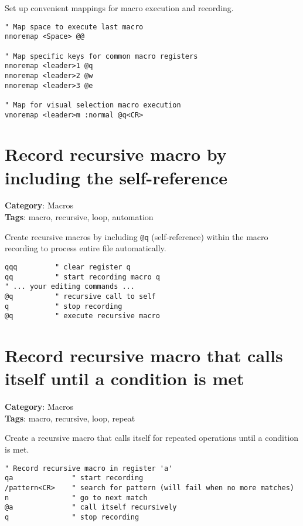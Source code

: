 {{{{{{{Set up convenient mappings for macro execution and recording.

\begin{Exa*}{}
\begin{Verbatim}[fontsize=\footnotesize, breaklines, breakanywhere]
" Map space to execute last macro
nnoremap <Space> @@

" Map specific keys for common macro registers
nnoremap <leader>1 @q
nnoremap <leader>2 @w
nnoremap <leader>3 @e

" Map for visual selection macro execution
vnoremap <leader>m :normal @q<CR>
\end{Verbatim}
\end{Exa*}

\section{Record recursive macro by including the self-reference}

\textbf{Category}: Macros\\ \textbf{Tags}: macro, recursive, loop, automation
\vspace{0.5cm}

Create recursive macros by including {\footnotesize \Verb§@q§} (self-reference) within the macro recording to process entire file automatically.

\begin{Exa*}{}
\begin{Verbatim}[fontsize=\footnotesize, breaklines, breakanywhere]
qqq         " clear register q
qq          " start recording macro q
" ... your editing commands ...
@q          " recursive call to self
q           " stop recording
@q          " execute recursive macro
\end{Verbatim}
\end{Exa*}

\section{Record recursive macro that calls itself until a condition is met}

\textbf{Category}: Macros\\ \textbf{Tags}: macro, recursive, loop, repeat
\vspace{0.5cm}

Create a recursive macro that calls itself for repeated operations until a condition is met.

\begin{Exa*}{}
\begin{Verbatim}[fontsize=\footnotesize, breaklines, breakanywhere]
" Record recursive macro in register 'a'
qa              " start recording
/pattern<CR>    " search for pattern (will fail when no more matches)
n               " go to next match
@a              " call itself recursively
q               " stop recording


\end{Verbatim}
\end{Exa*}}}}}}}}
